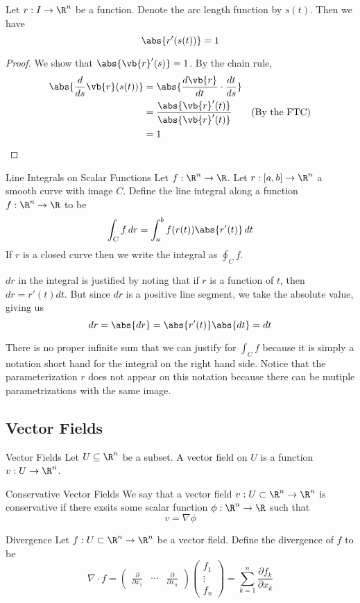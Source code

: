 \documentclass[a4paper]{article}
\begin{document}
\begin{lmm}{}{} Let $r:I\to\R^n$ be a function. Denote the arc length function by $s(t)$. Then we have $$\abs{r'(s(t))}=1$$ \tcbline
\begin{proof} We show that $\abs{\vb{r}'(s)}=1$. By the chain rule, 
\begin{align*}
\abs{\frac{d}{ds}\vb{r}(s(t))}&=\abs{\frac{d\vb{r}}{dt}\cdot\frac{dt}{ds}}\\
&=\frac{\abs{\vb{r}'(t)}}{\abs{\vb{r}'(t)}}\tag{By the FTC}\\
&=1
\end{align*}
\end{proof}
\end{lmm}

\begin{defn}{Line Integrals on Scalar Functions}{} Let $f:\R^n\to\R$. Let $r:[a,b]\to\R^n$ a smooth curve with image $C$. Define the line integral along a function $f:\R^n\to\R$ to be $$\int_Cf\,dr=\int_a^bf(r(t))\abs{r'(t)}\,dt$$ If $r$ is a closed curve then we write the integral as $\oint_Cf$. 
\end{defn}

$dr$ in the integral is justified by noting that if $r$ is a function of $t$, then $dr=r'(t)dt$. But since $dr$ is a positive line segment, we take the absolute value, giving us $$dr=\abs{dr}=\abs{r'(t)}\abs{dt}=dt$$

There is no proper infinite sum that we can justify for $\int_Cf$ because it is simply a notation short hand for the integral on the right hand side. Notice that the parameterization $r$ does not appear on this notation because there can be mutiple parametrizations with the same image. 

\subsection{Vector Fields}
\begin{defn}{Vector Fields}{} Let $U\subseteq\R^n$ be a subset. A vector field on $U$ is a function $v:U\to\R^n$. 
\end{defn}

\begin{defn}{Conservative Vector Fields}{} We say that a vector field $v:U\subset\R^n\to\R^n$ is conservative if there exsits some scalar function $\phi:\R^n\to\R$ such that $$v=\nabla\phi$$
\end{defn}

\begin{defn}{Divergence}{} Let $f:U\subset\R^n\to\R^n$ be a vector field. Define the divergence of $f$ to be $$\nabla\cdot f=\begin{pmatrix}\frac{\partial}{\partial x_1} & \cdots & \frac{\partial}{\partial x_n}\end{pmatrix}\begin{pmatrix}f_1\\\vdots\\f_n\end{pmatrix}=\sum_{k=1}^n\frac{\partial f_k}{\partial x_k}$$
\end{defn}
\end{document}
